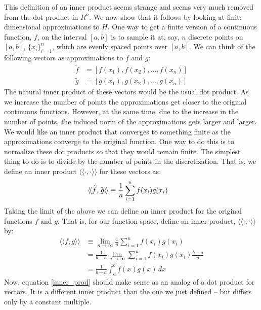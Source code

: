 \documentclass{article}
\begin{document}
This definition of an inner product seems strange and seems very much removed from the
dot product in $R^n$. We now show that it follows by looking at finite dimensional
approximations to $H$. One way to get a finite version of a continuous function, $f$,
on the interval $[a,b]$ is to sample
it at, say, $n$ discrete points on $[a,b]$, $\{x_i\}_{i=1}^n$, which
are evenly spaced points over $[a,b]$.
We can think of the following vectors as approximations to $f$ and $g$:
\begin{align*}
{\widetilde f} &= [f(x_1), f(x_2), \ldots, f(x_n)] \\
{\widetilde g} &= [g(x_1), g(x_2), \ldots, g(x_n)]
\end{align*}
The natural inner product of these vectors would be the usual dot product.
As we increase the number of points the approximations get closer to the original
continuous functions. However, at the same time, due to the increase in the
number of points, the induced norm of the approximations gets larger and larger.
We would like an inner product that converges to something finite as the
approximations converge to the original function.
One way to do this is to normalize these dot products so that they would remain
finite. The simplest thing to do is to divide by the number of points
in the discretization.
That is, we define
an inner product $\langle\!\langle \cdot ,\cdot\rangle\!\rangle$
for these vectors as:
\begin{align}
  \langle\!\langle {\widetilde f}, \, {{\vphantom {\widetilde f}}\widetilde g}\rangle\!\rangle &\equiv \frac{1}{n} \sum_{i=1}^n f(x_i) g(x_i)
\end{align}
Taking the limit of the above we can define an inner product for the original functions
$f$ and $g$. That is, for our function space, define an inner product, $\langle\!\langle \cdot ,\cdot\rangle\!\rangle$ by:
\begin{align*}
  \langle\!\langle f, g\rangle\!\rangle &\equiv \lim_{n\rightarrow \infty} \frac{1}{n} \sum_{i=1}^n f(x_i) g(x_i) \\
&= \frac{1}{b-a} \lim_{n\rightarrow \infty}  \sum_{i=1}^n f(x_i) g(x_i) \frac{b-a}{n} \\
&= \frac{1}{b-a} \int_{a}^b f(x) g(x) \, dx
\end{align*}
Now, equation \eqref{inner_prod} should make sense as an analog of a
dot product for vectors. It is a different inner product than the one we just defined
 -- but differs only by a constant multiple.
\end{document}
